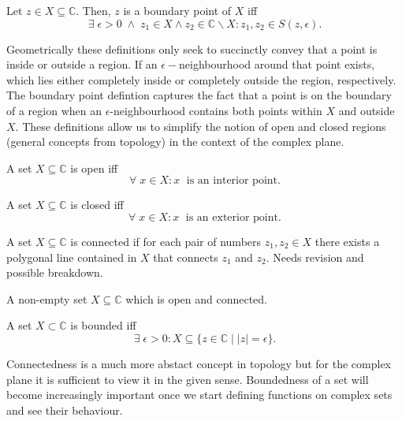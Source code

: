 \documentclass[12pt]{book}
\begin{document}
\begin{defn}
    Let $z \in X \subseteq \mathbb{C}.$ Then, $z$ is a boundary point of $X$ iff
    $$
        \exists\; \epsilon > 0\; \land \; z_1 \in X \land z_2 \in \mathbb{C}\backslash X:
            z_1, z_2 \in S(z, \epsilon).
    $$
\end{defn}
Geometrically these definitions only seek to succinctly convey that a point is inside or outside a region. If an $\epsilon-$neighbourhood around that point exists, which lies either completely inside or completely outside the region, respectively. The boundary point defintion captures the fact that a point is on the boundary of a region when an $\epsilon$-neighbourhood contains both points within $X$ and outside $X$. These definitions allow us to simplify the notion of open and closed regions (general concepts from topology) in the context of the complex plane. 

\begin{defn}
    A set $X \subseteq \mathbb{C}$ is open iff
    $$
        \forall\; x \in X: x\;\text{ is an interior point}.
    $$
\end{defn}

\begin{defn}
    A set $X \subseteq \mathbb{C}$ is closed iff
    $$
        \forall\; x \in X: x\;\text{ is an exterior point}.
    $$
\end{defn}

\begin{defn}
    A set $X \subseteq \mathbb{C}$ is connected if for each pair of numbers $z_1, z_2 \in X$ there exists a polygonal line contained in $X$ that connects $z_1$ and $z_2$.
    {\color{red} Needs revision and possible breakdown.}
\end{defn}

\begin{defn}[Domain]
    A non-empty set $X \subseteq \mathbb{C}$ which is open and connected. 
\end{defn}

\begin{defn}[Bounded]
    A set $X \subset \mathbb{C}$ is bounded iff
    $$
        \exists\; \epsilon > 0: X \subseteq \{z \in \mathbb{C}\; |\; |z| = \epsilon\}.
    $$
\end{defn}

Connectedness is a much more abstact concept in topology but for the complex plane it is sufficient to view it in the given sense. Boundedness of a set will become increasingly important once we start defining functions on complex sets and see their behaviour.
\end{document}
